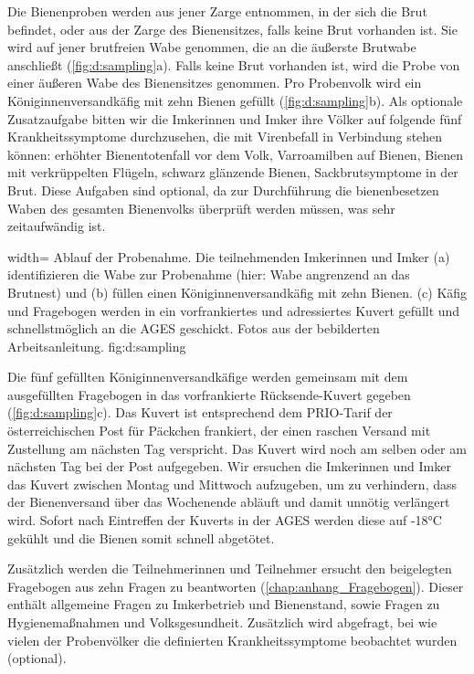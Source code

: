 Die Bienenproben werden aus jener Zarge entnommen, in der sich die Brut befindet, oder aus der Zarge des Bienensitzes, falls keine Brut vorhanden ist. Sie wird auf jener brutfreien Wabe genommen, die an die äußerste Brutwabe anschließt (\cref{fig:d:sampling}a). Falls keine Brut vorhanden ist, wird die Probe von einer äußeren Wabe des Bienensitzes genommen. Pro Probenvolk wird ein Königinnenversandkäfig mit zehn Bienen gefüllt (\cref{fig:d:sampling}b). Als optionale Zusatzaufgabe bitten wir die Imkerinnen und Imker ihre Völker auf folgende fünf Krankheitssymptome durchzusehen, die mit Virenbefall in Verbindung stehen können: erhöhter Bienentotenfall vor dem Volk, Varroamilben auf Bienen, Bienen mit verkrüppelten Flügeln, schwarz glänzende Bienen, Sackbrutsymptome in der Brut. 
Diese Aufgaben sind optional, da zur Durchführung die bienenbesetzen Waben des gesamten Bienenvolks überprüft werden müssen, was sehr zeitaufwändig ist.


  {width=\textwidth} %
  {Ablauf der Probenahme. Die teilnehmenden Imkerinnen und Imker (a) identifizieren die Wabe zur Probenahme (hier: Wabe angrenzend an das Brutnest) und (b) füllen einen Königinnenversandkäfig mit zehn Bienen. (c) Käfig und Fragebogen werden in ein vorfrankiertes und adressiertes Kuvert gefüllt und schnellstmöglich an die AGES geschickt. Fotos aus der bebilderten Arbeitsanleitung.} %
  {} %
  {fig:d:sampling} %


Die fünf gefüllten Königinnenversandkäfige werden gemeinsam mit dem ausgefüllten Fragebogen in das vorfrankierte Rücksende-Kuvert gegeben (\cref{fig:d:sampling}c). Das Kuvert ist entsprechend dem PRIO-Tarif der österreichischen Post für Päckchen frankiert, der einen raschen Versand mit Zustellung am nächsten Tag verspricht. Das Kuvert wird noch am selben oder am nächsten Tag bei der Post aufgegeben. Wir ersuchen die Imkerinnen und Imker das Kuvert zwischen Montag und Mittwoch aufzugeben, um zu verhindern, dass der Bienenversand über das Wochenende abläuft und damit unnötig verlängert wird. Sofort nach Eintreffen der Kuverts in der AGES werden diese auf -18°C gekühlt und die Bienen somit schnell abgetötet.

Zusätzlich werden die Teilnehmerinnen und Teilnehmer ersucht den beigelegten Fragebogen aus zehn Fragen zu beantworten (\cref{chap:anhang_Fragebogen}). Dieser enthält allgemeine Fragen zu Imkerbetrieb und Bienenstand, sowie Fragen zu Hygienemaßnahmen und Volksgesundheit. Zusätzlich wird abgefragt, bei wie vielen der Probenvölker die definierten Krankheitssymptome beobachtet wurden (optional).


